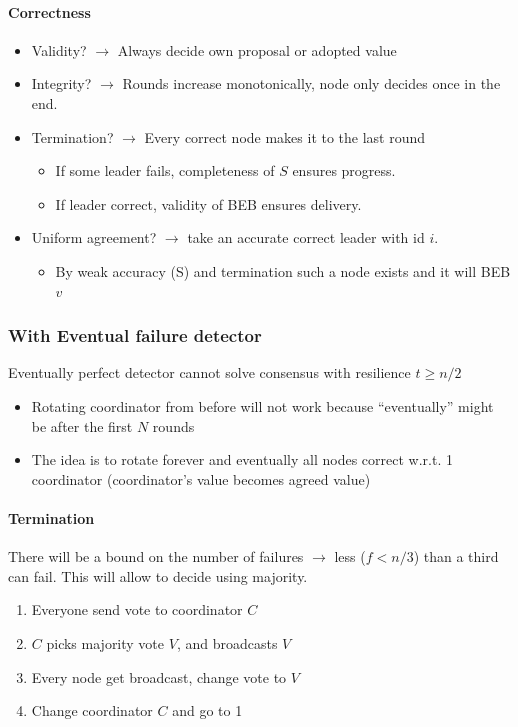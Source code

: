 \paragraph{Correctness}
\begin{itemize}
	\item Validity? $\to$ Always decide own proposal or adopted value
	\item Integrity? $\to$ Rounds increase monotonically, node only
	decides once in the end.
	\item Termination? $\to$ Every correct node makes it to the last round
	\begin{itemize}
		\item If some leader fails, completeness of $S$ ensures progress.
		\item If leader correct, validity of BEB ensures delivery.
	\end{itemize}
	\item Uniform agreement? $\to$ take an accurate correct leader with id $i$.
        \begin{itemize}
            \item By weak accuracy (S) and termination such a node exists
                and it will BEB $v$
        \end{itemize}
\end{itemize}


\subsubsection{With Eventual failure detector}
Eventually perfect detector cannot solve consensus with resilience $t \geq n/2$

\begin{itemize}
	\item Rotating coordinator from before will not work because
	\enquote{eventually} might be after the first $N$ rounds
	\item The idea is to rotate forever and eventually all nodes
	correct w.r.t. 1 coordinator (coordinator's value becomes
	agreed value)
\end{itemize}

\paragraph{Termination}
There will be a bound on the number of failures $\to$ less ($f<n/3$) than a third
can fail. This will allow to decide using majority.

\begin{enumerate}
	\item Everyone send vote to coordinator $C$
	\item $C$ picks majority vote $V$, and broadcasts $V$
	\item Every node get broadcast, change vote to $V$
	\item Change coordinator $C$ and go to 1
\end{enumerate}

